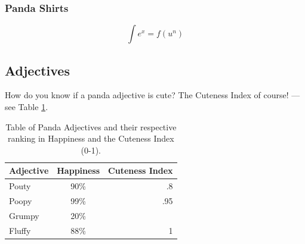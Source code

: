 \documentclass[11pt, oneside]{article}   	%
\begin{document}
\subsubsection{Panda Shirts}

$$ \int \!e^x = f(u^n)$$					%


\subsection{Adjectives}
How do you know if a panda adjective is cute? The Cuteness Index of course! --- see Table \ref{tab:cuteness}.      %
\begin{table}[h]                                           %
\begin{center}
\begin{tabular}{l | c | r}                                %
Adjective & Happiness & Cuteness Index   \\                  %
\hline         						%
Pouty & 90\% & .8   \\                                              %
Poopy & 99\% & .95 \\
Grumpy &  20\% & \\                                  %
Fluffy & 88\% & 1                                                  %
\end{tabular}
\end{center}
\caption{\label{tab:cuteness} Table of Panda Adjectives and their respective ranking in Happiness and the Cuteness Index (0-1).}
\end{table}

\end{document}
